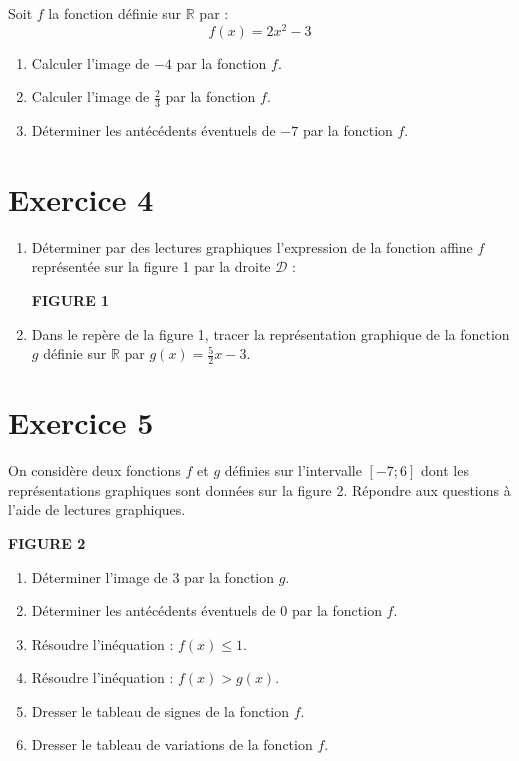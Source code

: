 \documentclass[12pt]{article}
\begin{document}
Soit $f$ la fonction définie sur $\mathbb{R}$ par :
\[
f(x) = 2x^2 - 3
\]

\begin{enumerate}
    \item Calculer l'image de $-4$ par la fonction $f$.
    \item Calculer l'image de $\frac{2}{3}$ par la fonction $f$.
    \item Déterminer les antécédents éventuels de $-7$ par la fonction $f$.
\end{enumerate}

\section*{Exercice 4}

\begin{enumerate}
    \item Déterminer par des lectures graphiques l'expression de la fonction affine $f$ représentée sur la figure 1 par la droite $\mathcal{D}$ :

    \begin{center}
        \textbf{FIGURE 1}
    \end{center}

    \item Dans le repère de la figure 1, tracer la représentation graphique de la fonction $g$ définie sur $\mathbb{R}$ par $g(x) = \frac{5}{2}x - 3$.
\end{enumerate}

\section*{Exercice 5}

On considère deux fonctions $f$ et $g$ définies sur l'intervalle $[-7; 6]$ dont les représentations graphiques sont données sur la figure 2. Répondre aux questions à l'aide de lectures graphiques.

\begin{center}
    \textbf{FIGURE 2}
\end{center}

\begin{enumerate}
    \item Déterminer l'image de $3$ par la fonction $g$.
    \item Déterminer les antécédents éventuels de $0$ par la fonction $f$.
    \item Résoudre l'inéquation : $f(x) \leq 1$.
    \item Résoudre l'inéquation : $f(x) > g(x)$.
    \item Dresser le tableau de signes de la fonction $f$.
    \item Dresser le tableau de variations de la fonction $f$.
\end{enumerate}
\end{document}
